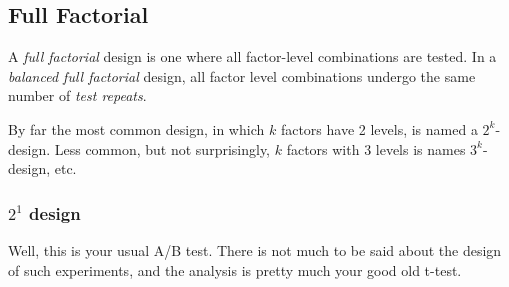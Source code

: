 \subsection{Full Factorial}
A \emph{full factorial} design is one where all factor-level combinations are tested.
In a \emph{balanced full factorial} design, all factor level combinations undergo the same number of \emph{test repeats}.

By far the most common design, in which $k$ factors have 2 levels, is named a $2^k$-design.
Less common, but not surprisingly, $k$ factors with 3 levels is names $3^k$-design, etc.




\subsubsection{$2^1$ design}
Well, this is your usual A/B test. 
There is not much to be said about the design of such experiments, and the analysis is pretty much your good old t-test.





